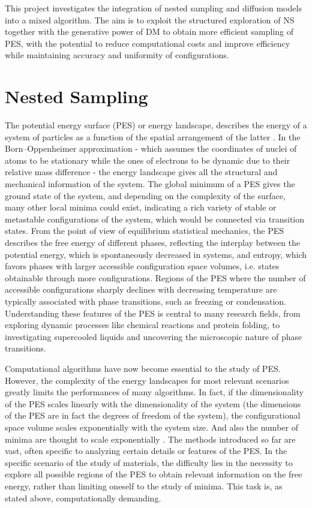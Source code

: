 \documentclass[a4paper, 12pt]{article}          %
\begin{document}
This project investigates the integration of nested sampling and diffusion models into a mixed algorithm. The aim is to exploit the structured exploration of NS together with the generative power of DM to obtain more efficient sampling of PES, with the potential to reduce computational costs and improve efficiency while maintaining accuracy and uniformity of configurations. 


\section{Nested Sampling}

The potential energy surface (PES) or energy landscape, describes the energy of a system of particles as a function of the spatial arrangement of the latter \cite{Wales_2004}. In the Born–Oppenheimer approximation - which assumes the coordinates of nuclei of atoms to be stationary while the ones of electrons to be dynamic due to their relative mass difference - the energy landscape gives all the structural and mechanical information of the system. The global minimum of a PES gives the ground state of the system, and depending on the complexity of the surface, many other local minima could exist, indicating a rich variety of stable or metastable configurations of the system, which would be connected via transition states. From the point of view of equilibrium statistical mechanics, the PES describes the free energy of different phases, reflecting the interplay between the potential energy, which is spontaneously decreased in systems, and entropy, which favors phases with larger accessible configuration space volumes, i.e. states obtainable through more configurations. Regions of the PES where the number of accessible configurations sharply declines with decreasing temperature are typically associated with phase transitions, such as freezing or condensation. Understanding these features of the PES is central to many research fields, from exploring dynamic processes like chemical reactions and protein folding, to investigating supercooled liquids and uncovering the microscopic nature of phase transitions.

Computational algorithms have now become essential to the study of PES. However, the complexity of the energy landscapes for most relevant scenarios greatly limits the performances of many algorithms. In fact, if the dimensionality of the PES scales linearly with the dimensionality of the system (the dimensions of the PES are in fact the degrees of freedom of the system), the configurational space volume scales exponentially with the system size. And also the number of minima are thought to scale exponentially \cite{Hoare1979}. The methods introduced so far are vast, often specific to analyzing certain details or features of the PES. In the specific scenario of the study of materials, the difficulty lies in the necessity to explore all possible regions of the PES to obtain relevant information on the free energy, rather than limiting oneself to the study of minima. This task is, as stated above, computationally demanding. 
\end{document}
